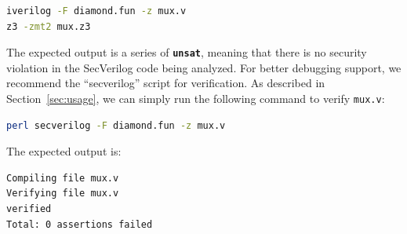 \documentclass [12pt, oneside, a4paper]{article}
\newcommand{\code}[1]{\texttt{#1}}
\begin{document}
{\begin{lstlisting}[language=bash, frame=none, numbers=none,
keywordstyle=\footnotesize\bfseries, morekeywords={make}]
iverilog -F diamond.fun -z mux.v
z3 -zmt2 mux.z3
\end{lstlisting}

The expected output is a series of \textbf{\code{unsat}}, meaning that
there is no security violation in the SecVerilog code being analyzed.
For better debugging support, we recommend the ``secverilog'' script
for verification. As described in Section~\ref{sec:usage}, we can
simply run the following command to verify \code{mux.v}:
\begin{lstlisting}[language=bash, frame=none, numbers=none,
keywordstyle=\footnotesize\bfseries, morekeywords={make}]
perl secverilog -F diamond.fun -z mux.v
\end{lstlisting}

The expected output is:

\begin{lstlisting}[language=bash, frame=none, numbers=none,
keywordstyle=\footnotesize\bfseries, morekeywords={make}]
Compiling file mux.v
Verifying file mux.v
verified
Total: 0 assertions failed
\end{lstlisting}




}
\end{document}
